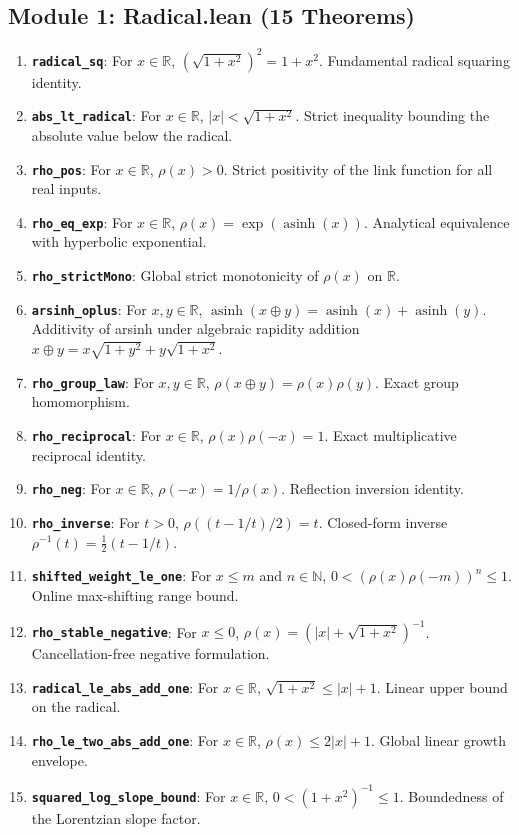 \documentclass[11pt,a4paper]{article}
\theoremstyle{definition}
\newcommand{\asinh}{\operatorname{asinh}}
\begin{document}
\subsection{Module 1: Radical.lean (15 Theorems)}
\begin{enumerate}
    \item \textbf{\texttt{radical\_sq}}: For $x \in \mathbb{R}$, $(\sqrt{1 + x^2})^2 = 1 + x^2$. Fundamental radical squaring identity.
    \item \textbf{\texttt{abs\_lt\_radical}}: For $x \in \mathbb{R}$, $|x| < \sqrt{1 + x^2}$. Strict inequality bounding the absolute value below the radical.
    \item \textbf{\texttt{rho\_pos}}: For $x \in \mathbb{R}$, $\rho(x) > 0$. Strict positivity of the link function for all real inputs.
    \item \textbf{\texttt{rho\_eq\_exp}}: For $x \in \mathbb{R}$, $\rho(x) = \exp(\asinh(x))$. Analytical equivalence with hyperbolic exponential.
    \item \textbf{\texttt{rho\_strictMono}}: Global strict monotonicity of $\rho(x)$ on $\mathbb{R}$.
    \item \textbf{\texttt{arsinh\_oplus}}: For $x, y \in \mathbb{R}$, $\asinh(x \oplus y) = \asinh(x) + \asinh(y)$. Additivity of arsinh under algebraic rapidity addition $x \oplus y = x\sqrt{1+y^2} + y\sqrt{1+x^2}$.
    \item \textbf{\texttt{rho\_group\_law}}: For $x, y \in \mathbb{R}$, $\rho(x \oplus y) = \rho(x)\rho(y)$. Exact group homomorphism.
    \item \textbf{\texttt{rho\_reciprocal}}: For $x \in \mathbb{R}$, $\rho(x)\rho(-x) = 1$. Exact multiplicative reciprocal identity.
    \item \textbf{\texttt{rho\_neg}}: For $x \in \mathbb{R}$, $\rho(-x) = 1/\rho(x)$. Reflection inversion identity.
    \item \textbf{\texttt{rho\_inverse}}: For $t > 0$, $\rho((t - 1/t)/2) = t$. Closed-form inverse $\rho^{-1}(t) = \frac{1}{2}(t - 1/t)$.
    \item \textbf{\texttt{shifted\_weight\_le\_one}}: For $x \le m$ and $n \in \mathbb{N}$, $0 < (\rho(x)\rho(-m))^n \le 1$. Online max-shifting range bound.
    \item \textbf{\texttt{rho\_stable\_negative}}: For $x \le 0$, $\rho(x) = (|x| + \sqrt{1 + x^2})^{-1}$. Cancellation-free negative formulation.
    \item \textbf{\texttt{radical\_le\_abs\_add\_one}}: For $x \in \mathbb{R}$, $\sqrt{1 + x^2} \le |x| + 1$. Linear upper bound on the radical.
    \item \textbf{\texttt{rho\_le\_two\_abs\_add\_one}}: For $x \in \mathbb{R}$, $\rho(x) \le 2|x| + 1$. Global linear growth envelope.
    \item \textbf{\texttt{squared\_log\_slope\_bound}}: For $x \in \mathbb{R}$, $0 < (1 + x^2)^{-1} \le 1$. Boundedness of the Lorentzian slope factor.
\end{enumerate}
\end{document}
